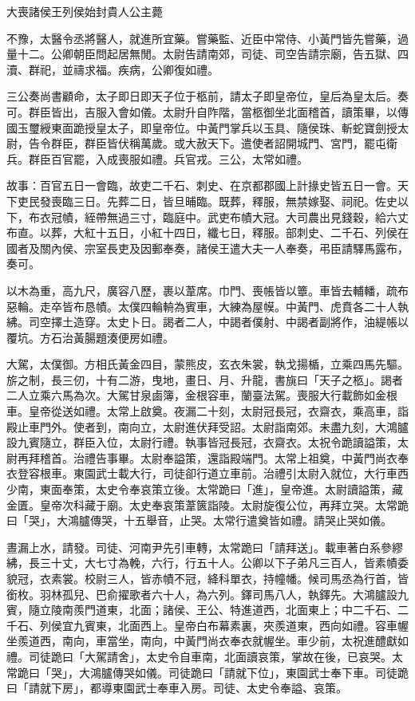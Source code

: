 
\begin{pinyinscope}
大喪諸侯王列侯始封貴人公主薨

不豫，太醫令丞將醫人，就進所宜藥。嘗藥監、近臣中常侍、小黃門皆先嘗藥，過量十二。公卿朝臣問起居無閒。太尉告請南郊，司徒、司空告請宗廟，告五獄、四瀆、群祀，並禱求福。疾病，公卿復如禮。

三公奏尚書顧命，太子即日即天子位于柩前，請太子即皇帝位，皇后為皇太后。奏可。群臣皆出，吉服入會如儀。太尉升自阼階，當柩御坐北面稽首，讀策畢，以傳國玉璽綬東面跪授皇太子，即皇帝位。中黃門掌兵以玉具、隨侯珠、斬蛇寶劍授太尉，告令群臣，群臣皆伏稱萬歲。或大赦天下。遣使者詔開城門、宮門，罷屯衛兵。群臣百官罷，入成喪服如禮。兵官戎。三公，太常如禮。

故事：百官五日一會臨，故吏二千石、刺史、在京都郡國上計掾史皆五日一會。天下吏民發喪臨三日。先葬二日，皆旦晡臨。既葬，釋服，無禁嫁娶、祠祀。佐史以下，布衣冠幘，絰帶無過三寸，臨庭中。武吏布幘大冠。大司農出見錢穀，給六丈布直。以葬，大紅十五日，小紅十四日，纖七日，釋服。部刺史、二千石、列侯在國者及關內侯、宗室長吏及因郵奉奏，諸侯王遣大夫一人奉奏，弔臣請驛馬露布，奏可。

以木為重，高九尺，廣容八歷，裹以葦席。巾門、喪帳皆以簟。車皆去輔轓，疏布惡輪。走卒皆布恳幘。太僕四輪輈為賓車，大練為屋幙。中黃門、虎賁各二十人執紼。司空擇土造穿。太史卜日。謁者二人，中謁者僕射、中謁者副將作，油緹帳以覆坑。方石治黃腸題湊便房如禮。

大駕，太僕御。方相氏黃金四目，蒙熊皮，玄衣朱裳，執戈揚楯，立乘四馬先驅。旂之制，長三仞，十有二游，曳地，畫日、月、升龍，書旐曰「天子之柩」。謁者二人立乘六馬為次。大駕甘泉鹵簿，金根容車，蘭臺法駕。喪服大行載飾如金根車。皇帝從送如禮。太常上啟奠。夜漏二十刻，太尉冠長冠，衣齋衣，乘高車，詣殿止車門外。使者到，南向立，太尉進伏拜受詔。太尉詣南郊。未盡九刻，大鴻臚設九賓隨立，群臣入位，太尉行禮。執事皆冠長冠，衣齋衣。太祝令跪讀謚策，太尉再拜稽首。治禮告事畢。太尉奉謚策，還詣殿端門。太常上祖奠，中黃門尚衣奉衣登容根車。東園武士載大行，司徒卻行道立車前。治禮引太尉入就位，大行車西少南，東面奉策，太史令奉哀策立後。太常跪曰「進」，皇帝進。太尉讀謚策，藏金匱。皇帝次科藏于廟。太史奉哀策葦篋詣陵。太尉旋復公位，再拜立哭。太常跪曰「哭」，大鴻臚傳哭，十五舉音，止哭。太常行遣奠皆如禮。請哭止哭如儀。

晝漏上水，請發。司徒、河南尹先引車轉，太常跪曰「請拜送」。載車著白系參繆紼，長三十丈，大七寸為輓，六行，行五十人。公卿以下子弟凡三百人，皆素幘委貌冠，衣素裳。校尉三人，皆赤幘不冠，絳科單衣，持幢幡。候司馬丞為行首，皆銜枚。羽林孤兒、巴俞擢歌者六十人，為六列。鐸司馬八人，執鐸先。大鴻臚設九賓，隨立陵南羨門道東，北面；諸侯、王公、特進道西，北面東上；中二千石、二千石、列侯宜九賓東，北面西上。皇帝白布幕素裏，夾羨道東，西向如禮。容車幄坐羨道西，南向，車當坐，南向，中黃門尚衣奉衣就幄坐。車少前，太祝進醴獻如禮。司徒跪曰「大駕請舍」，太史令自車南，北面讀哀策，掌故在後，已哀哭。太常跪曰「哭」，大鴻臚傳哭如儀。司徒跪曰「請就下位」，東園武士奉下車。司徒跪曰「請就下房」，都導東園武士奉車入房。司徒、太史令奉謚、哀策。


\end{pinyinscope}
